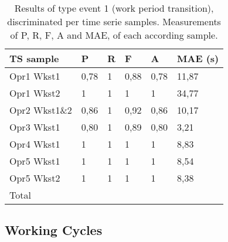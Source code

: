 \begin{table}
\caption{Results of type event 1 (work period transition), discriminated per time serie samples. Measurements of \gls{P}, \gls{R}, \gls{F}, \gls{A} and \gls{MAE}, of each according sample.}
\label{table:auto_scores}
\centering
\begin{tabular}{llllll}
\toprule
TS sample         & \gls{P}    & \gls{R} & \gls{F}    & \gls{A}  & \gls{MAE} (s) \\
\midrule
\gls{Opr}1 \gls{Wkst}1      & 0,78 & 1 & 0,88 & 0,78 & 11,87   \\
\gls{Opr}1 \gls{Wkst}2      & 1    & 1 & 1    & 1    & 34,77   \\
\gls{Opr}2 \gls{Wkst}1\&2 & 0,86 & 1 & 0,92 & 0,86 & 10,17   \\
\gls{Opr}3 \gls{Wkst}1    & 0,80 & 1 & 0,89 & 0,80 & 3,21    \\
\gls{Opr}4 \gls{Wkst}1    & 1    & 1 & 1    & 1    & 8,83    \\
\gls{Opr}5 \gls{Wkst}1      & 1    & 1 & 1    & 1    & 8,54    \\
\gls{Opr}5 \gls{Wkst}2      & 1    & 1 & 1    & 1    & 8,38   \\ \hline
Total & & & & &

\bottomrule

\end{tabular}
\end{table}

\subsection{Working Cycles}

